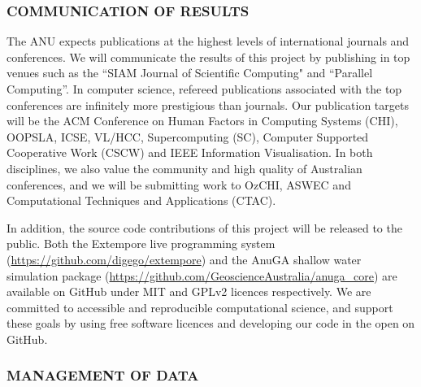 \documentclass[a4paper,fontsize=13pt]{scrartcl}
\begin{document}
\subsubsection*{COMMUNICATION OF RESULTS}


The ANU expects publications at the highest levels of international journals and conferences.
We will communicate the results of this project by publishing in
top  venues such as the ``SIAM Journal of
Scientific Computing" and  “Parallel Computing”. In computer science, refereed publications associated with the top conferences are infinitely more prestigious  than journals. Our publication targets will be the ACM Conference on Human Factors in Computing Systems (CHI), OOPSLA, ICSE,  VL/HCC, Supercomputing (SC), Computer Supported Cooperative Work (CSCW) and IEEE Information Visualisation. In both disciplines, we also value the community and high quality of Australian conferences, and we will be submitting work to OzCHI, ASWEC and Computational Techniques and Applications (CTAC).


In addition, the source code contributions of this project will be
released to the public. Both the Extempore live programming system
(\url{https://github.com/digego/extempore}) and the AnuGA shallow
water simulation package
(\url{https://github.com/GeoscienceAustralia/anuga_core}) are
available on GitHub under MIT and GPLv2 licences respectively. We are
committed to accessible and reproducible computational science, and
support these goals by using free software licences and developing our
code in the open on GitHub.

\subsubsection*{MANAGEMENT OF DATA}
\end{document}
